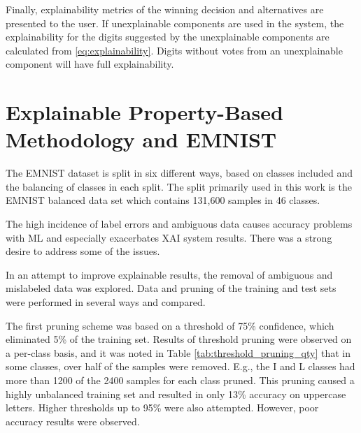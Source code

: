 Finally, explainability metrics of the winning decision and alternatives are
presented to the user. If unexplainable components are used in the system, the
explainability for the digits suggested by the unexplainable components are
calculated from \eqref{eq:explainability}. Digits without votes from an
unexplainable component will have full explainability.

\section{Explainable Property-Based Methodology and EMNIST}

The EMNIST dataset is split in six different ways, based on classes included and
the balancing of classes in each split. The split primarily used in this work is
the EMNIST balanced data set which contains 131,600 samples in 46 classes.




The high incidence of label errors and ambiguous data causes accuracy problems
with ML and especially exacerbates XAI system results. There was a strong desire
to address some of the issues.

In an attempt to improve explainable results, the removal of ambiguous and
mislabeled data was explored. Data and pruning of the training and test sets
were performed in several ways and compared.

The first pruning scheme was based on a threshold of 75\% confidence, which
eliminated 5\% of the training set. Results of threshold pruning were observed
on a per-class basis, and it was noted in Table \ref{tab:threshold_pruning_qty}
that in some classes, over half of the samples were removed.  E.g., the I and L
classes had more than 1200 of the 2400 samples for each class pruned. This
pruning caused a highly unbalanced training set and resulted in only 13\%
accuracy on uppercase letters. Higher thresholds up to 95\% were also attempted.
However, poor accuracy results were observed\cite{whitten23}.

